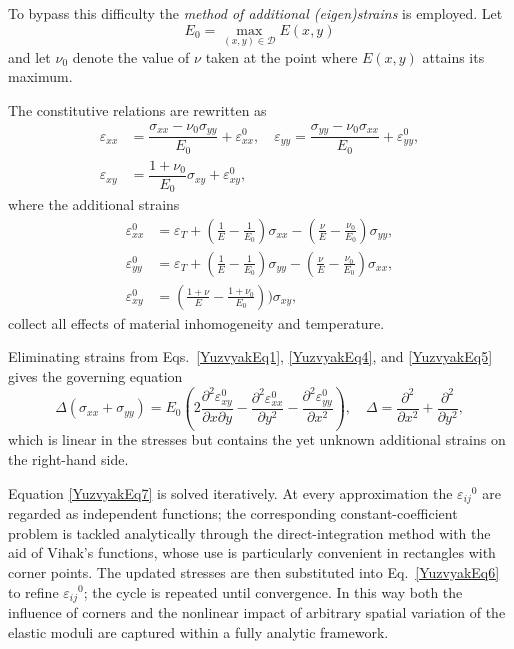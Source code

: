 To bypass this difficulty the \emph{method of additional (eigen)strains} is employed.  
Let
 \[E_0=\displaystyle\max_{(x,y)\in\mathcal{D}}E(x,y)\]
 and let \(\nu_{0}\) denote the value of \(\nu\) taken at the point where \(E(x,y)\) attains its maximum.
   
The constitutive relations are rewritten as
\begin{equation}
	\begin{array}{ll}
		\varepsilon_{xx}&=\dfrac{\sigma_{xx}-\nu_0\sigma_{yy}}{E_0}+\varepsilon_{xx}^{0},\quad
		\varepsilon_{yy}=\dfrac{\sigma_{yy}-\nu_0\sigma_{xx}}{E_0}+\varepsilon_{yy}^{0},
		\\
		\varepsilon_{xy}&=\dfrac{1+\nu_0}{E_0} \sigma_{xy}+\varepsilon_{xy}^{0},
	\label{YuzvyakEq5}
	\end{array}
\end{equation}
where the additional strains  
\begin{align}
	\varepsilon_{xx}^{0}&=\varepsilon_T+\left(\frac{1}{E}-\frac{1}{E_0}\right)\sigma_{xx}-\left(\frac{\nu}{E}-\tfrac{\nu_0}{E_0}\right)\sigma_{yy},\nonumber\\
	\varepsilon_{yy}^{0}&=\varepsilon_T+\left(\frac{1}{E}-\frac{1}{E_0}\right)\sigma_{yy}-\left(\frac{\nu}{E}-\frac{\nu_0}{E_0}\right)\sigma_{xx},\label{YuzvyakEq6}
	\\
	\varepsilon_{xy}^{0}&=\left(\frac{1+\nu}{E}-\frac{1+\nu_0}{E_0}\right))\sigma_{xy},\nonumber
\end{align}
collect all effects of material inhomogeneity and temperature.

Eliminating strains from Eqs.~\eqref{YuzvyakEq1}, \eqref{YuzvyakEq4}, and \eqref{YuzvyakEq5} gives the governing equation
\begin{equation}
	\Delta\left(\sigma_{xx}+\sigma_{yy}\right)=
	E_0 \left(
	2\frac{\partial^{2}\varepsilon_{xy}^{0}}{\partial x\partial y}
	-\frac{\partial^{2}\varepsilon_{xx}^{0}}{\partial y^{2}}
	-\frac{\partial^{2}\varepsilon_{yy}^{0}}{\partial x^{2}}
	\right),
	\quad
	\Delta=\frac{\partial^{2}}{\partial x^{2}}+\frac{\partial^{2}}{\partial y^{2}},
	\label{YuzvyakEq7}
\end{equation}
which is linear in the stresses but contains the yet unknown additional strains on the right-hand side.


Equation \eqref{YuzvyakEq7} is solved iteratively.  
At every approximation the \(\varepsilon_{ij}{}^{0}\) are regarded as independent functions; the corresponding constant-coefficient problem is tackled analytically through the direct-integration method with the aid of Vihak’s functions, whose use is particularly convenient in rectangles with corner points.  
The updated stresses are then substituted into Eq.~\eqref{YuzvyakEq6} to refine \(\varepsilon_{ij}{}^{0}\); the cycle is repeated until convergence.  
In this way both the influence of corners and the nonlinear impact of arbitrary spatial variation of the elastic moduli are captured within a fully analytic framework.

